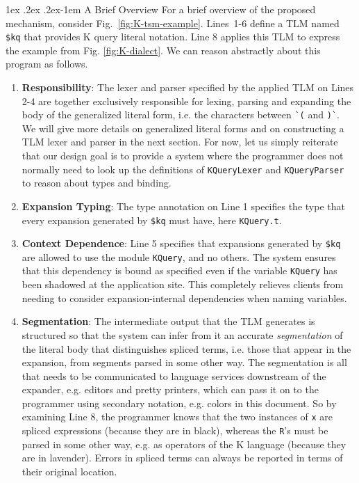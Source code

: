 \documentclass[acmsmall]{acmart}
\makeatletter
\renewcommand{\paragraph}{%
  \@startsection{paragraph}{4}%
  {\z@}{1ex \@plus .2ex \@minus .2ex}{-1em}%
  {\normalfont\normalsize\bfseries}%
}
\newcommand{\li}[1]{\lstinline[basicstyle=\ttfamily\fontsize{9pt}{1em}\selectfont]{#1}}
\makeatother
\begin{document}
\paragraph{A Brief Overview} For a brief overview of the proposed mechanism, consider Fig.~\ref{fig:K-tsm-example}. Lines~1-6 define a TLM named \li{$kq} that provides K query literal notation. Line 8 applies this TLM to express the example from Fig. \ref{fig:K-dialect}. We can reason abstractly about this program as follows.
\begin{enumerate}[leftmargin=12pt]
\item \textbf{Responsibility}: The lexer and parser specified by the applied TLM on Lines 2-4 are together exclusively responsible for lexing, parsing and expanding the body of the generalized literal form, i.e. the characters between \li{`(} and \li{)`}. We will give more details on generalized literal forms and on constructing a TLM lexer and parser in the next section. For now, let us simply reiterate that our design goal is to provide a system where the programmer does not normally need to look up the definitions of \li{KQueryLexer} and \li{KQueryParser} to reason about types and binding. %
\item \textbf{Expansion Typing}: The type annotation on Line 1 specifies the type that every expansion generated by \li{$kq} must have, here \li{KQuery.t}.
\item \textbf{Context Dependence}: Line 5 specifies that expansions generated by \li{$kq} are allowed to use the module \li{KQuery}, and no others. The system ensures that this dependency is  bound as specified even if the variable \li{KQuery} has been shadowed at the application site. This completely relieves clients from needing to consider expansion-internal dependencies when naming variables. %
\item \textbf{Segmentation}: The intermediate output that the TLM generates is structured so that the system can infer from it an accurate \emph{segmentation} of the literal body that distinguishes spliced terms, i.e. those that appear in the expansion, from segments  parsed in some other way. The segmentation is all that needs to be communicated to language services downstream of the expander, e.g. editors and pretty printers, which can pass it on to the programmer using secondary notation, e.g. colors in this document. So by examining Line 8, the programmer knows that the two instances of \li{x} are spliced expressions (because they are in black), whereas the \li{R}'s must be parsed in some other way, e.g. as operators of the K language (because they are in lavender). Errors in spliced terms can always be reported in terms of their original location.

\end{enumerate}
\end{document}
